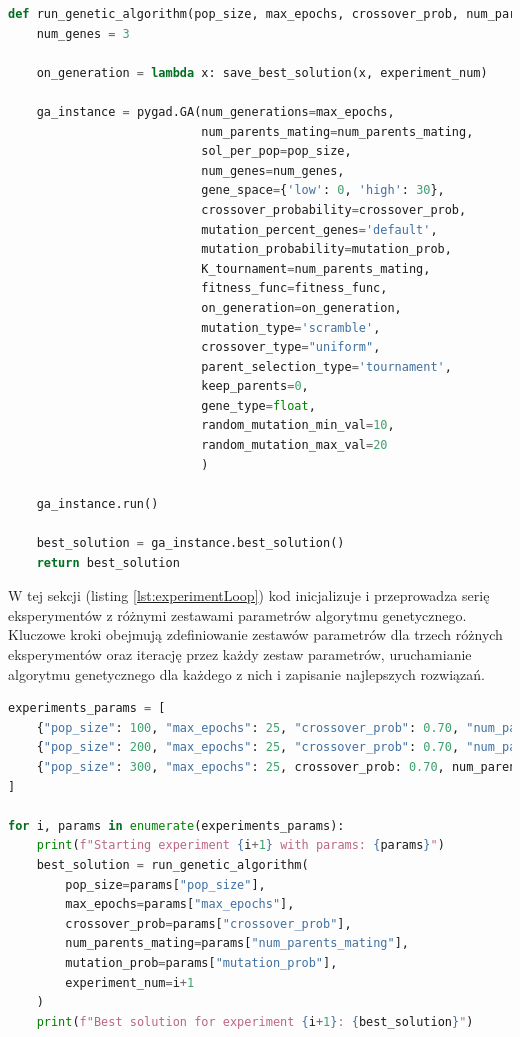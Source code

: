 \documentclass[12pt,twoside]{article}
\begin{document}
\begin{lstlisting}[language=Python, caption=Uruchamianie algorytmu genetycznego, label={lst:runGA}]
def run_genetic_algorithm(pop_size, max_epochs, crossover_prob, num_parents_mating, mutation_prob, experiment_num):
    num_genes = 3 

    on_generation = lambda x: save_best_solution(x, experiment_num)
    
    ga_instance = pygad.GA(num_generations=max_epochs,
                           num_parents_mating=num_parents_mating,
                           sol_per_pop=pop_size,
                           num_genes=num_genes,
                           gene_space={'low': 0, 'high': 30},
                           crossover_probability=crossover_prob,
                           mutation_percent_genes='default',
                           mutation_probability=mutation_prob,
                           K_tournament=num_parents_mating,
                           fitness_func=fitness_func,
                           on_generation=on_generation,
                           mutation_type='scramble',
                           crossover_type="uniform",
                           parent_selection_type='tournament',
                           keep_parents=0,
                           gene_type=float,
                           random_mutation_min_val=10,
                           random_mutation_max_val=20
                           )

    ga_instance.run()
    
    best_solution = ga_instance.best_solution()
    return best_solution
\end{lstlisting}

W tej sekcji (listing \ref{lst:experimentLoop}) kod inicjalizuje i przeprowadza serię eksperymentów z różnymi zestawami parametrów algorytmu genetycznego. Kluczowe kroki obejmują zdefiniowanie zestawów parametrów dla trzech różnych eksperymentów oraz iterację przez każdy zestaw parametrów, uruchamianie algorytmu genetycznego dla każdego z nich i zapisanie najlepszych rozwiązań.

\begin{lstlisting}[language=Python, caption=Pętla przeprowadzająca eksperymenty, label={lst:experimentLoop}]
experiments_params = [
    {"pop_size": 100, "max_epochs": 25, "crossover_prob": 0.70, "num_parents_mating": 10, "mutation_prob": 0.15},
    {"pop_size": 200, "max_epochs": 25, "crossover_prob": 0.70, "num_parents_mating": 15, "mutation_prob": 0.15},
    {"pop_size": 300, "max_epochs": 25, crossover_prob: 0.70, num_parents_mating: 20, mutation_prob: 0.15}
]

for i, params in enumerate(experiments_params):
    print(f"Starting experiment {i+1} with params: {params}")
    best_solution = run_genetic_algorithm(
        pop_size=params["pop_size"],
        max_epochs=params["max_epochs"],
        crossover_prob=params["crossover_prob"],
        num_parents_mating=params["num_parents_mating"],
        mutation_prob=params["mutation_prob"],
        experiment_num=i+1
    )
    print(f"Best solution for experiment {i+1}: {best_solution}")
\end{lstlisting}
\end{document}
